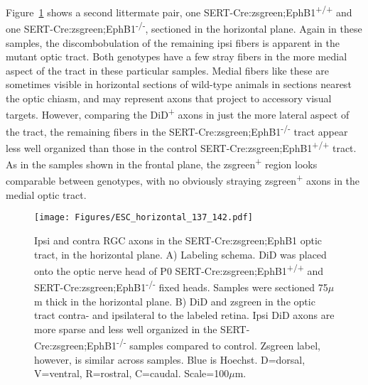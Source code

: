 Figure~\ref{ESChorizontal} shows a second littermate pair, one SERT-Cre:zsgreen;EphB1\textsuperscript{+/+} and one SERT-Cre:zsgreen;EphB1\textsuperscript{-/-}, sectioned in the horizontal plane.
Again in these samples, the discombobulation of the remaining ipsi fibers is apparent in the mutant optic tract.
Both genotypes have a few stray fibers in the more medial aspect of the tract in these particular samples.
Medial fibers like these are sometimes visible in horizontal sections of wild-type animals in sections nearest the optic chiasm, and may represent axons that project to accessory visual targets.
However, comparing the DiD\textsuperscript{+} axons in just the more lateral aspect of the tract, the remaining fibers in the SERT-Cre:zsgreen;EphB1\textsuperscript{-/-} tract appear less well organized than those in the control SERT-Cre:zsgreen;EphB1\textsuperscript{+/+} tract.
As in the samples shown in the frontal plane, the zsgreen\textsuperscript{+} region looks comparable between genotypes, with no obviously straying zsgreen\textsuperscript{+} axons in the medial optic tract.
\begin{figure}[hbtp]
    \begin{center}
        \texttt{[image: Figures/ESC\_horizontal\_137\_142.pdf]}
        \caption[Ipsi and contra RGC axons in the SERT-Cre:zsgreen;EphB1 optic tract, in the horizontal plane.]
        {Ipsi and contra RGC axons in the SERT-Cre:zsgreen;EphB1 optic tract, in the horizontal plane.
        A) Labeling schema.
        DiD was placed onto the optic nerve head of P0 SERT-Cre:zsgreen;EphB1\textsuperscript{+/+} and SERT-Cre:zsgreen;EphB1\textsuperscript{-/-} fixed heads.
        Samples were sectioned 75$\mu$m thick in the horizontal plane.
        B) DiD and zsgreen in the optic tract contra- and ipsilateral to the labeled retina.
        Ipsi DiD axons are more sparse and less well organized in the SERT-Cre:zsgreen;EphB1\textsuperscript{-/-} samples compared to control.
        Zsgreen label, however, is similar across samples.
        Blue is Hoechst.
        D=dorsal, V=ventral, R=rostral, C=caudal.
        Scale=100$\mu$m.}
        \label{ESChorizontal}
    \end{center}
\end{figure}

